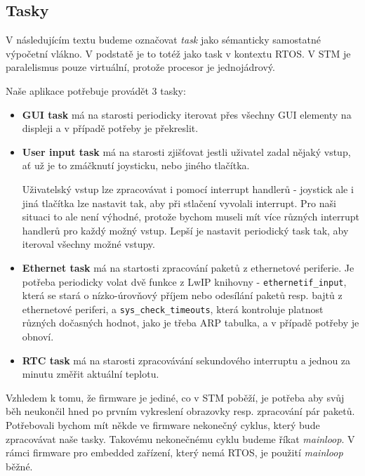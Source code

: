 \subsection{Tasky}

V následujícím textu budeme označovat \emph{task} jako sémanticky samostatné výpočetní
vlákno.
V podstatě je to totéž jako task v kontextu RTOS.
V STM je paralelismus pouze virtuální, protože procesor je jednojádrový.

Naše aplikace potřebuje provádět 3 tasky:
\begin{itemize}
  \item \textbf{GUI task} má na starosti periodicky iterovat přes všechny GUI elementy
    na displeji a v případě potřeby je překreslit.

  \item \textbf{User input task} má na starosti zjišťovat jestli uživatel zadal nějaký
    vstup, ať už je to zmáčknutí joysticku, nebo jiného tlačítka.

    Uživatelský vstup lze zpracovávat i pomocí interrupt handlerů - joystick
    ale i jiná tlačítka lze nastavit tak, aby při stlačení vyvolali interrupt.
    Pro naši situaci to ale není výhodné, protože bychom museli mít více různých
    interrupt handlerů pro každý možný vstup.
    Lepší je nastavit periodický task tak, aby iteroval všechny možné vstupy.

  \item \textbf{Ethernet task} má na startosti zpracování paketů z ethernetové
    periferie. Je potřeba periodicky volat dvě funkce z LwIP knihovny -
    \texttt{ethernetif\_input}, která se stará o nízko-úrovňový příjem nebo odesílání paketů resp.
    bajtů z ethernetové periferi, a \texttt{sys\_check\_timeouts}, která kontroluje platnost různých
    dočasných hodnot, jako je třeba ARP tabulka, a v případě potřeby je obnoví.

  \item \textbf{RTC task} má na starosti zpracovávání sekundového interruptu a jednou za
    minutu změřit aktuální teplotu.
\end{itemize}

Vzhledem k tomu, že firmware je jediné, co v STM poběží, je potřeba aby svůj běh neukončil
hned po prvním vykreslení obrazovky resp. zpracování pár paketů.
Potřebovali bychom mít někde ve firmware nekonečný cyklus, který bude zpracovávat naše
tasky.
Takovému nekonečnému cyklu budeme říkat \emph{mainloop}.
V rámci firmware pro embedded zařízení, který nemá RTOS, je použití \emph{mainloop} běžné.

